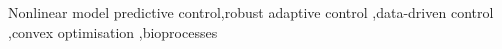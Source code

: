 \documentclass[final,5p,times,twocolumn,authoryear]{elsarticle}
\begin{document}
\begin{frontmatter}







\begin{keyword}
Nonlinear model predictive control\sep robust adaptive control \sep data-driven control \sep convex optimisation \sep bioprocesses
%
%
%
\end{keyword}

\end{frontmatter}


\end{document}
